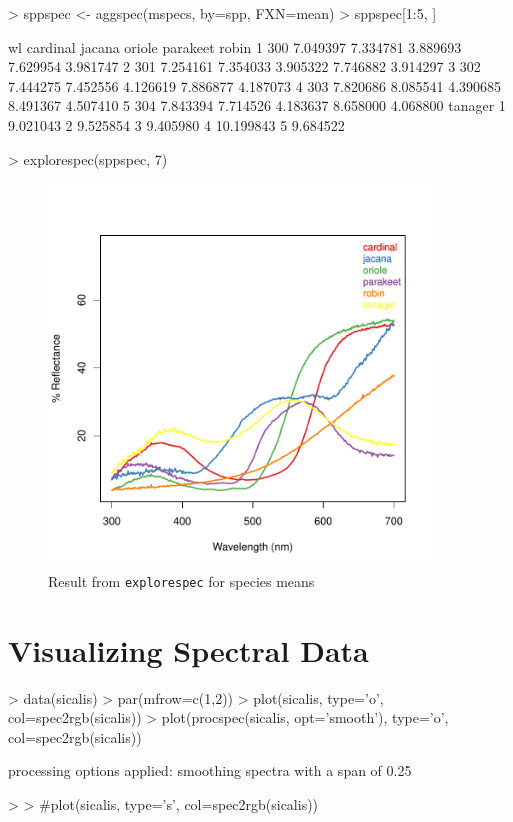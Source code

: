 \documentclass{article}
\newcommand{\code}[1]{{\tt #1}}  %
\begin{document}
\begin{Schunk}
\begin{Sinput}
> sppspec <- aggspec(mspecs, by=spp, FXN=mean)
> sppspec[1:5, ]
\end{Sinput}
\begin{Soutput}
   wl cardinal   jacana   oriole parakeet    robin
1 300 7.049397 7.334781 3.889693 7.629954 3.981747
2 301 7.254161 7.354033 3.905322 7.746882 3.914297
3 302 7.444275 7.452556 4.126619 7.886877 4.187073
4 303 7.820686 8.085541 4.390685 8.491367 4.507410
5 304 7.843394 7.714526 4.183637 8.658000 4.068800
    tanager
1  9.021043
2  9.525854
3  9.405980
4 10.199843
5  9.684522
\end{Soutput}
\begin{Sinput}
> explorespec(sppspec, 7)
\end{Sinput}
\end{Schunk}

\begin{figure}[h] %
\begin{center}
\includegraphics[width=4in]{pavo-exploresppmeans}
\end{center}
\caption{Result from \code{explorespec} for species means}
\label{fig2}
\end{figure}


\section{Visualizing Spectral Data}

\begin{Schunk}
\begin{Sinput}
> data(sicalis)
> par(mfrow=c(1,2))
> plot(sicalis, type='o', col=spec2rgb(sicalis))
> plot(procspec(sicalis, opt='smooth'), type='o', col=spec2rgb(sicalis))
\end{Sinput}
\begin{Soutput}
processing options applied:
 smoothing spectra with a span of 0.25 
\end{Soutput}
\begin{Sinput}
> 
> #plot(sicalis, type='s', col=spec2rgb(sicalis))
\end{Sinput}
\end{Schunk}
\end{document}
